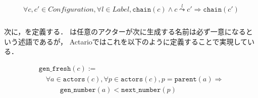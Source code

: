\begin{lemma}{\chainpreserv}
\begin{displaymath}
  \begin{array}{l}
    \forall c, c' \in \textit{Configuration}, \forall l \in \textit{Label},
    \texttt{chain}(c) \wedge c \overset{l}{\leadsto} c' \Rightarrow \texttt{chain}(c')
  \end{array}
\end{displaymath}
\end{lemma}


\subsubsection{\fresh}

次に，\fresh を定義する．
\fresh は任意のアクターが次に生成する名前は必ず一意になるという述語であるが，
Actarioではこれを以下のように定義することで実現している．

\begin{definition}{\fresh}
\begin{displaymath}
  \begin{array}{l}
    \texttt{gen\_fresh}(c) := \\
    \quad \forall a \in \texttt{actors}(c), \forall p \in \texttt{actors}(c), p = \texttt{parent}(a) \Rightarrow \\
    \quad \quad \quad \texttt{gen\_number}(a) < \texttt{next\_number}(p)
  \end{array}
\end{displaymath}
\end{definition}

